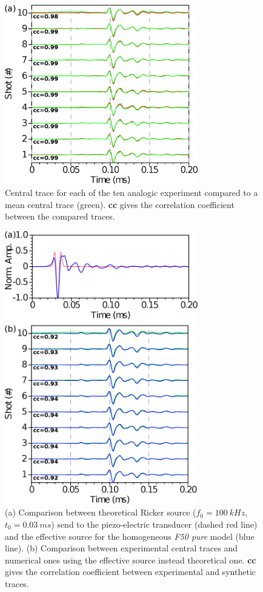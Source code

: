 \documentclass[manuscript,revised]{geophysics}
\begin{document}
\begin{figure}[!h]
	\centering
	\includegraphics[width=0.75\textwidth]{fig/musc_F50_CT.eps}
	\caption{Central trace for each of the ten analogic experiment compared to a mean central trace (green). \textbf{cc} gives the correlation coefficient between the compared traces.}
	\label{panel_central_traces_cc}
\end{figure}

\begin{figure}[!h]
	\centering
	\includegraphics[width=0.75\textwidth]{fig/spec_F50_CT_COMP.eps}
	\caption{(a) Comparison between theoretical Ricker source ($f_{0}=100\ kHz$, $t_{0}=0.03\ ms$) send to the piezo-electric transducer (dashed red line) and the effective source for the homogeneous \textit{F50 pure} model (blue line). (b) Comparison between experimental central traces and numerical ones using the effective source instead theoretical one. \textbf{cc} gives the correlation coefficient between experimental and synthetic traces.}
	\label{panel_srcest_2d_mean_comp}
\end{figure}
\end{document}
